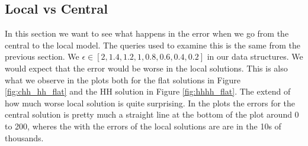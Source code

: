 \documentclass[11pt]{article}
\theoremstyle{definition}
\begin{document}
\newpage\subsection{Local vs Central}
In this section we want to see what happens in the error when we go from the central to the local model. The queries used to examine this is the same from the previous section. We $\epsilon\in[2, 1.4, 1.2, 1, 0.8, 0.6, 0.4, 0.2]$ in our data structures. We would expect that the error would be worse in the local solutions. This is also what we observe in the plots both for the flat solutions in Figure \ref{fig:chh_hh_flat} and the HH solution in Figure \ref{fig:hhhh_flat}. The extend of how much worse local solution is quite surprising. In the plots the errors for the central solution is pretty much a straight line at the bottom of the plot around 0 to 200, wheres the with the errors of the local solutions are are in the 10s of thousands. 
\end{document}
